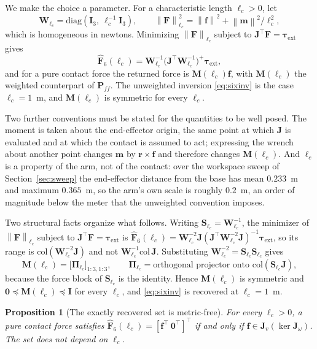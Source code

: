 \documentclass{ieeeaccess}
\newtheorem{proposition}{Proposition}
\newcommand{\norm}[1]{\left\| #1 \right\|}
\newcommand{\Jv}{\bm{J}_{\!v}}
\newcommand{\Jw}{\bm{J}_{\!\omega}}
\newcommand{\Jfull}{\bm{J}}
\newcommand{\Pff}{\bm{P}_{\!f\!f}}
\newcommand{\lc}{\ell_c}
\newcommand{\Wlc}{\bm{W}_{\!\lc}}
\newcommand{\Mlc}{\bm{M}(\lc)}
\newcommand{\tauext}{\bm{\tau}_{\mathrm{ext}}}
\begin{document}
We make the choice a parameter. For a characteristic length $\lc>0$, let
\begin{equation}
\Wlc=\mathrm{diag}\!\left(\bm I_3,\ \lc^{-1}\bm I_3\right),
\qquad
\norm{\bm F}_{\lc}^2=\norm{\bm f}^2+\norm{\bm m}^2/\lc^2 ,
\label{eq:wmetric}
\end{equation}
which is homogeneous in newtons. Minimizing $\norm{\bm F}_{\lc}$ subject to
$\Jfull^{\!\top}\bm F=\tauext$ gives
\begin{equation}
\hat{\bm F}_6(\lc)=\Wlc^{-1}\big(\Jfull^{\!\top}\Wlc^{-1}\big)^{\!+}\tauext ,
\label{eq:sixinvw}
\end{equation}
and for a pure contact force the returned force is $\Mlc\bm f$, with $\Mlc$ the
weighted counterpart of $\Pff$. The unweighted inversion \eqref{eq:sixinv} is the
case $\lc=1$~m, and $\Mlc$ is symmetric for every $\lc$.

Two further conventions must be stated for the quantities to be well posed. The
moment is taken about the end-effector origin, the same point at which $\Jfull$ is
evaluated and at which the contact is assumed to act; expressing the wrench about
another point changes $\bm m$ by $\bm r\times\bm f$ and therefore changes $\Mlc$.
And $\lc$ is a property of the arm, not of the contact: over the workspace sweep
of Section~\ref{sec:sweep} the end-effector distance from the base has mean
$0.233$~m and maximum $0.365$~m, so the arm's own scale is roughly $0.2$~m, an
order of magnitude below the meter that the unweighted convention imposes.

Two structural facts organize what follows. Writing $\bm S_{\lc}=\Wlc^{-1}$, the
minimizer of $\norm{\bm F}_{\lc}$ subject to $\Jfull^{\!\top}\bm F=\tauext$ is
$\hat{\bm F}_6(\lc)=\Wlc^{-2}\Jfull(\Jfull^{\!\top}\Wlc^{-2}\Jfull)^{-1}\tauext$,
so its range is $\mathrm{col}(\Wlc^{-2}\Jfull)$ and not $\Wlc^{-1}\mathrm{col}\,
\Jfull$. Substituting $\Wlc^{-2}=\bm S_{\lc}\bm S_{\lc}$ gives
\begin{equation}
\Mlc=\big[\bm\Pi_{\lc}\big]_{1:3,1:3},
\qquad
\bm\Pi_{\lc}=\text{orthogonal projector onto }\mathrm{col}(\bm S_{\lc}\Jfull),
\label{eq:Mproj}
\end{equation}
because the force block of $\bm S_{\lc}$ is the identity. Hence $\Mlc$ is
symmetric and $\bm 0\preceq\Mlc\preceq\bm I$ for every $\lc$, and \eqref{eq:sixinv}
is recovered at $\lc=1$~m.

\begin{proposition}[The exactly recovered set is metric-free]
For every $\lc>0$, a pure contact force satisfies
$\hat{\bm F}_6(\lc)=[\bm f^{\!\top}\ \bm 0^{\!\top}]^{\!\top}$ if and only if
$\bm f\in\Jv(\ker\Jw)$. The set does not depend on $\lc$.
\label{prop:metric}
\end{proposition}
\end{document}
